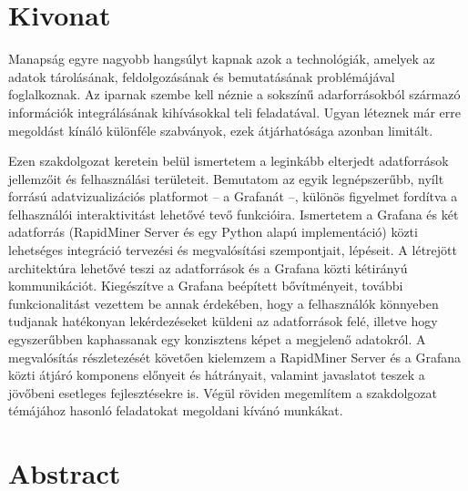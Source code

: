 \setcounter{page}{1}

\selecthungarian

\chapter*{Kivonat}

Manapság egyre nagyobb hangsúlyt kapnak azok a technológiák, amelyek az adatok tárolásának, feldolgozásának és bemutatásának problémájával foglalkoznak. Az iparnak szembe kell néznie a sokszínű adarforrásokból származó információk integrálásának kihívásokkal teli feladatával. Ugyan léteznek már erre megoldást kínáló különféle szabványok, ezek átjárhatósága azonban limitált.

Ezen szakdolgozat keretein belül ismertetem a leginkább elterjedt adatforrások jellemzőit és felhasználási területeit. Bemutatom az egyik legnépszerűbb, nyílt forrású adatvizualizációs platformot -- a Grafanát --, különös figyelmet fordítva a felhasználói interaktivitást lehetővé tevő funkcióira. Ismertetem a Grafana és két adatforrás (RapidMiner Server és egy Python alapú implementáció) közti lehetséges integráció tervezési és megvalósítási szempontjait, lépéseit. A létrejött architektúra lehetővé teszi az adatforrások és a Grafana közti kétirányú kommunikációt. Kiegészítve a Grafana beépített bővítményeit, további funkcionalitást vezettem be annak érdekében, hogy a felhasználók könnyeben tudjanak hatékonyan lekérdezéseket küldeni az adatforrások felé, illetve hogy egyszerűbben kaphassanak egy konzisztens képet a megjelenő adatokról. A megvalósítás részletezését követően kielemzem a RapidMiner Server és a Grafana közti átjáró komponens előnyeit és hátrányait, valamint javaslatot teszek a jövőbeni esetleges fejlesztésekre is. Végül röviden megemlítem a szakdolgozat témájához hasonló feladatokat megoldani kívánó munkákat.




\vfill
\selectenglish


\chapter*{Abstract}

